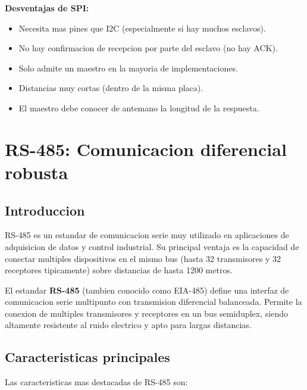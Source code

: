 \textbf{Desventajas de SPI:}
\begin{itemize}
    \item Necesita mas pines que I2C (especialmente si hay muchos esclavos).
    \item No hay confirmacion de recepcion por parte del esclavo (no hay ACK).
    \item Solo admite un maestro en la mayoria de implementaciones.
    \item Distancias muy cortas (dentro de la misma placa).
    \item El maestro debe conocer de antemano la longitud de la respuesta.
\end{itemize}


\section{RS-485: Comunicacion diferencial robusta}

\subsection{Introduccion}

RS-485 es un estandar de comunicacion serie muy utilizado en aplicaciones de
adquisicion de datos y control industrial. Su principal ventaja es la capacidad
de conectar multiples dispositivos en el mismo bus (hasta 32 transmisores y 32
receptores tipicamente) sobre distancias de hasta 1200 metros.

\begin{definicion}[RS-485]
El estandar \textbf{RS-485} (tambien conocido como EIA-485) define una interfaz
de comunicacion serie multipunto con transmision diferencial balanceada. Permite
la conexion de multiples transmisores y receptores en un bus semiduplex, siendo
altamente resistente al ruido electrico y apto para largas distancias.
\end{definicion}

\subsection{Caracteristicas principales}

Las caracteristicas mas destacadas de RS-485 son:

